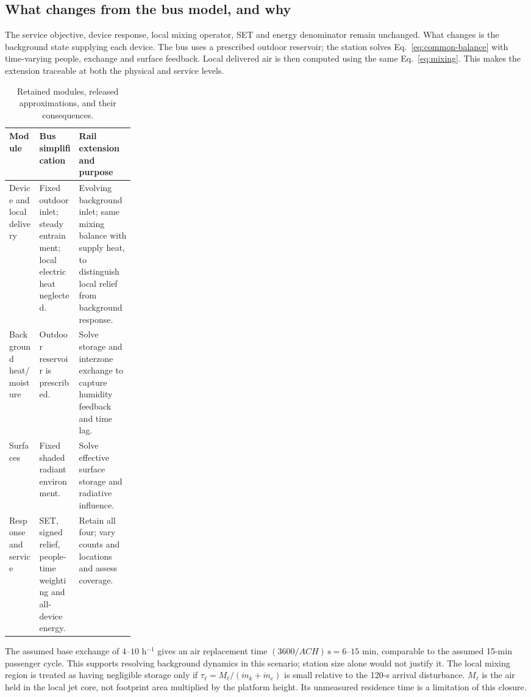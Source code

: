 \subsection{What changes from the bus model, and why}

The service objective, device response, local mixing operator, SET and energy denominator remain unchanged. What changes is the background state supplying each device. The bus uses a prescribed outdoor reservoir; the station solves Eq.~\eqref{eq:common-balance} with time-varying people, exchange and surface feedback. Local delivered air is then computed using the same Eq.~\eqref{eq:mixing}. This makes the extension traceable at both the physical and service levels.

\begin{table}[!ht]
\centering\small
\caption{Retained modules, released approximations, and their consequences.}
\label{tab:rail-changes}
\begin{tabularx}{\linewidth}{@{}>{\raggedright\arraybackslash}p{0.24\linewidth}XX@{}}
\toprule
Module & Bus simplification & Rail extension and purpose\\
\midrule
Device and local delivery & Fixed outdoor inlet; steady entrainment; local electric heat neglected. & Evolving background inlet; same mixing balance with supply heat, to distinguish local relief from background response.\\
Background heat/moisture & Outdoor reservoir is prescribed. & Solve storage and interzone exchange to capture humidity feedback and time lag.\\
Surfaces & Fixed shaded radiant environment. & Solve effective surface storage and radiative influence.\\
Response and service & SET, signed relief, people-time weighting and all-device energy. & Retain all four; vary counts and locations and assess coverage.\\
\bottomrule
\end{tabularx}
\end{table}

The assumed base exchange of $4$--$10$ h$^{-1}$ gives an air replacement time $(3600/ACH)\,\mathrm{s}=6$--$15$ min, comparable to the assumed 15-min passenger cycle. This supports resolving background dynamics in this scenario; station size alone would not justify it. The local mixing region is treated as having negligible storage only if $\tau_\ell=M_\ell/(\dot m_k+\dot m_e)$ is small relative to the 120-s arrival disturbance. $M_\ell$ is the air held in the local jet core, not footprint area multiplied by the platform height. Its unmeasured residence time is a limitation of this closure.

